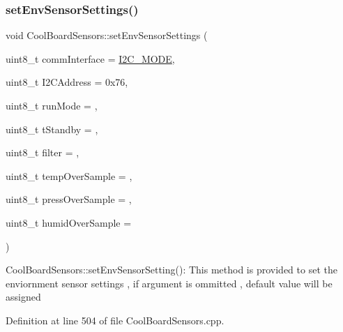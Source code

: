 \subsubsection{\texorpdfstring{set\+Env\+Sensor\+Settings()}{setEnvSensorSettings()}}
{\footnotesize\ttfamily void Cool\+Board\+Sensors\+::set\+Env\+Sensor\+Settings (\begin{DoxyParamCaption}\item[{uint8\+\_\+t}]{comm\+Interface = {\ttfamily \hyperlink{_cool_spark_fun_b_m_e280_8h_a5cd01756030509b764d43a2b8c94fce8}{I2\+C\+\_\+\+M\+O\+DE}},  }\item[{uint8\+\_\+t}]{I2\+C\+Address = {\ttfamily 0x76},  }\item[{uint8\+\_\+t}]{run\+Mode = {},  }\item[{uint8\+\_\+t}]{t\+Standby = {},  }\item[{uint8\+\_\+t}]{filter = {},  }\item[{uint8\+\_\+t}]{temp\+Over\+Sample = {},  }\item[{uint8\+\_\+t}]{press\+Over\+Sample = {},  }\item[{uint8\+\_\+t}]{humid\+Over\+Sample = {} }\end{DoxyParamCaption})}

Cool\+Board\+Sensors\+::set\+Env\+Sensor\+Setting()\+: This method is provided to set the enviornment sensor settings , if argument is ommitted , default value will be assigned 

Definition at line 504 of file Cool\+Board\+Sensors.\+cpp.


